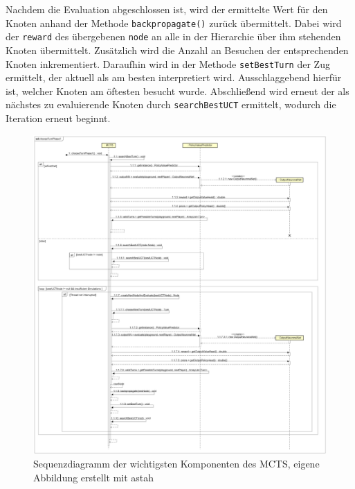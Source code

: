 \documentclass[12pt,a4paper]{article}
\begin{document}
Nachdem die Evaluation abgeschlossen ist, wird der ermittelte Wert für den Knoten anhand der Methode \texttt{backpropagate()} zurück übermittelt. Dabei wird der \texttt{reward} des übergebenen \texttt{node} an alle in der Hierarchie über ihm stehenden Knoten übermittelt. Zusätzlich wird die Anzahl an Besuchen der entsprechenden Knoten inkrementiert. Daraufhin wird in der Methode \texttt{setBestTurn} der Zug ermittelt, der aktuell als am besten interpretiert wird. Ausschlaggebend hierfür ist, welcher Knoten am öftesten besucht wurde. Abschließend wird erneut der als nächstes zu evaluierende Knoten durch \texttt{searchBestUCT} ermittelt, wodurch die Iteration erneut beginnt.

\begin{figure}
\centering
\includegraphics[width=1.0\textwidth]{pics/mcts_seq.png}	
\caption{Sequenzdiagramm der wichtigsten Komponenten des MCTS, eigene Abbildung erstellt mit astah}
\label{fig:mcts_seq}
\end{figure}
\end{document}
